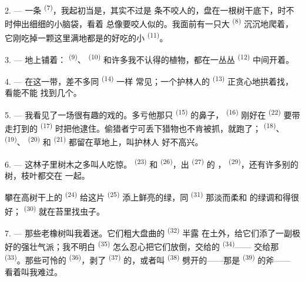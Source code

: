 2. --- 一条 \textsuperscript{(7)}，我起初当是，其实不过是
条不咬人的，盘在一根树干底下，时不时伸出细细的小脑袋，看着
总像要咬人似的。我面前有一只大 \textsuperscript{(8)} 沉沉地爬着，
它刚吃掉一颗这里满地都是的好吃的小 \textsuperscript{(11)}。

3. --- 地上铺着： \textsuperscript{(9)}、
 \textsuperscript{(10)} 和许多我不认得的植物，都在一丛丛
 \textsuperscript{(12)} 中间开着。

4. --- 在这一带，差不多同 \textsuperscript{(14)} 一样
常见；一个护林人的 \textsuperscript{(13)} 正贪心地拱着找，看能不能
找到几个。

\VUsaut{3.0mm}
\VUsaut{3.0mm}

5. --- 我看见了一场很有趣的戏的。多亏他那只
\textsuperscript{(15)} 的鼻子， \textsuperscript{(16)} 刚好在
 \textsuperscript{(22)} 要带走打到的 \textsuperscript{(17)}
时把他逮住。偷猎者宁可丢下猎物也不肯被抓，就跑了；
\textsuperscript{(18)}、 \textsuperscript{(19)}、
\textsuperscript{(20)} 和 \textsuperscript{(21)} 都留在草地上，叫护林人
好不高兴。

6. --- 这林子里树木之多叫人吃惊。 \textsuperscript{(23)} 和
 \textsuperscript{(26)}，出 \textsuperscript{(27)} 的
， \textsuperscript{(29)}，还有许多别的树，枝叶都交在
一起。

攀在高树干上的 \textsuperscript{(24)} 给这片
\textsuperscript{(25)} 添上鲜亮的绿，同 \textsuperscript{(31)} 那淡而柔和
的绿调和得很好； \textsuperscript{(30)} 就在苔里找虫子。

\VUsaut{3.0mm}
\VUsaut{3.0mm}

7. --- 那些老橡树叫我着迷。它们粗大盘曲的 \textsuperscript{(32)} 半露
在土外，给它们添了一副极好的强壮气派；我不明白 \textsuperscript{(35)}
怎么忍心把它们放倒，交给的 \textsuperscript{(34)}——
交给那 \textsuperscript{(33)}。那些可怜的
\textsuperscript{(36)}，剥了 \textsuperscript{(37)} 的，或者叫
\textsuperscript{(38)} 劈开的——那是 \textsuperscript{(39)} 的斧——
看着叫我难过。

